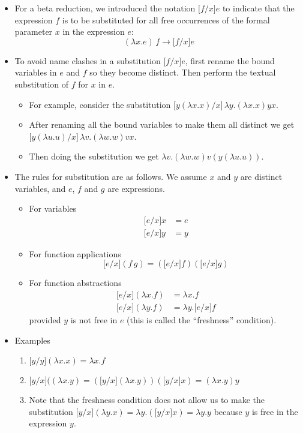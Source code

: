 \documentclass[]{article}
\begin{document}
\begin{itemize}
\item For a beta reduction, we introduced the notation $\lbrack f/x \rbrack e$ to indicate that the expression $f$ is to be substituted for all free occurrences of the formal parameter $x$ in the expression $e$:
\[ (\lambda x.e)\,f\rightarrow\lbrack f/x \rbrack e \]
\item To avoid name clashes in a substitution $\lbrack f/x \rbrack e$, first rename the bound variables in $e$ and $f$ so they become distinct. Then perform the textual substitution of $f$ for $x$ in $e$.
\begin{itemize}
\item For example, consider the substitution $\lbrack y(\lambda x.x)/x \rbrack\,\lambda y.(\lambda x.x)yx$.
\item After renaming all the bound variables to make them all distinct we get $\lbrack y(\lambda u.u)/x\rbrack\,\lambda v.(\lambda w.w)vx$.
\item Then doing the substitution we get $\lambda v.(\lambda w.w)v(y(\lambda u.u))$.
\end{itemize}
\item The rules for substitution are as follows. We assume $x$ and $y$ are distinct variables, and $e$, $f$ and $g$ are expressions.
\begin{itemize}
\item For variables
\begin{align*}
\lbrack e/x \rbrack x &= e \\
\lbrack e/x \rbrack y &= y
\end{align*}
\item For function applications
\[ \lbrack e/x \rbrack(f\,g) = (\lbrack e/x \rbrack f)(\lbrack e/x \rbrack g) \]
\item For function abstractions
\begin{align*}
\lbrack e/x \rbrack(\lambda x.f) &= \lambda x.f \\
\lbrack e/x \rbrack(\lambda y.f) &= \lambda y.\lbrack e/x \rbrack f
\end{align*}
provided $y$ is not free in $e$ (this is called the ``freshness'' condition).
\end{itemize}
\item Examples
\begin{enumerate}
\item $\lbrack y/y \rbrack (\lambda x.x) = \lambda x.f$
\item $\lbrack y/x \rbrack ((\lambda x.y) = (\lbrack y/x \rbrack(\lambda x.y))(\lbrack y/x \rbrack x) = (\lambda x.y)y$
\item Note that the freshness condition does not allow us to make the substitution $\lbrack y/x \rbrack(\lambda y.x) = \lambda y.(\lbrack y/x \rbrack x) = \lambda y.y$ because $y$ is free in the expression $y$.
\end{enumerate}
\end{itemize}
\end{document}
